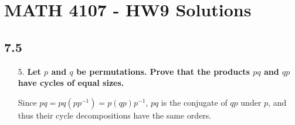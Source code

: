 \documentclass[a4paper,12pt]{article}
\begin{document}
\section*{MATH 4107 - HW9 Solutions}

\subsection*{7.5}
\begin{enumerate}
    \item[5.]
        \boldmath
        \textbf{Let $p$ and $q$ be permutations. Prove that the products $pq$ and $qp$ have cycles of equal sizes.} \par
        \unboldmath
        Since $pq = pq(pp^{-1}) = p(qp)p^{-1}$, $pq$ is the conjugate of $qp$ under $p$, and thus their cycle decompositions have the same orders.


\end{enumerate}
\end{document}
